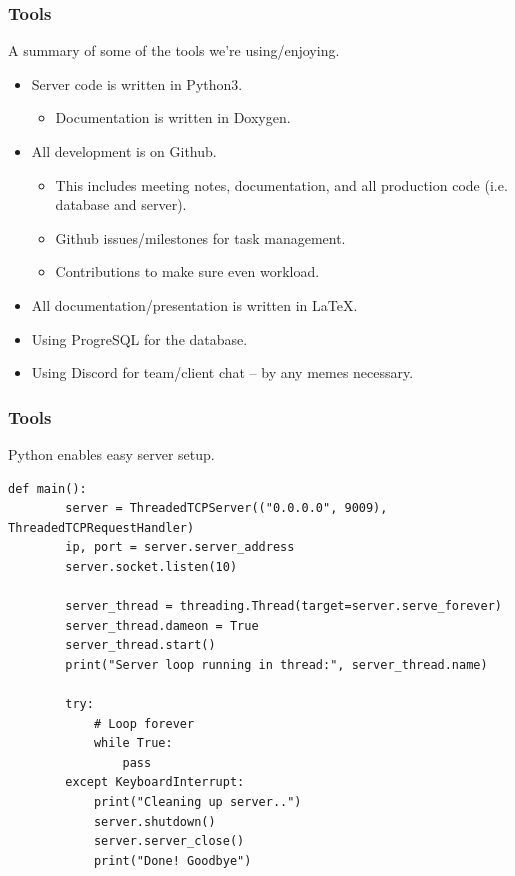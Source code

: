 \documentclass{beamer}
\newcounter{tools}
\begin{document}
\begin{frame}
    \frametitle{Tools }
    A summary of some of the tools we're using/enjoying.

    \begin{itemize}
        \item Server code is written in Python3.
        \begin{itemize}
            \item Documentation is written in Doxygen.
        \end{itemize}

        \item All development is on Github.
        \begin{itemize}
            \item This includes meeting notes, documentation, and all production code (i.e. database and server).
            \item Github issues/milestones for task management.
            \item Contributions to make sure even workload.
        \end{itemize}

        \item All documentation/presentation is written in \LaTeX{}.
        \item Using ProgreSQL for the database.
        \item Using Discord for team/client chat -- by any memes necessary.
    \end{itemize}
\end{frame}




\begin{frame}[fragile,c]
    \frametitle{Tools }

    Python enables easy server setup.

    \begin{lstlisting}[style=cpython]
    def main():
        server = ThreadedTCPServer(("0.0.0.0", 9009), ThreadedTCPRequestHandler)
        ip, port = server.server_address
        server.socket.listen(10)

        server_thread = threading.Thread(target=server.serve_forever)
        server_thread.dameon = True
        server_thread.start()
        print("Server loop running in thread:", server_thread.name)

        try:
            # Loop forever
            while True:
                pass
        except KeyboardInterrupt:
            print("Cleaning up server..")
            server.shutdown()
            server.server_close()
            print("Done! Goodbye")

    \end{lstlisting}
\end{frame}
\end{document}
